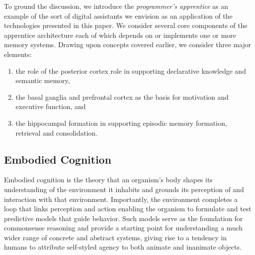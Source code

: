 \documentclass[letterpaper,11pt]{article}
\def\footnote#1{{}}
\def\urlh#1{{}}
\begin{document}
To ground the discussion, we introduce the {\it{programmer's apprentice}} as an example of the sort of digital assistants we envision as an application of the technologies presented in this paper. We consider several core components of the apprentice architecture each of which depends on or implements one or more memory systems. Drawing upon concepts covered earlier, we consider three major elements:
%
\begin{enumerate}
%
\item the role of the posterior cortex role in supporting declarative knowledge and semantic memory,
%
\item the basal ganglia and prefrontal cortex as the basis for motivation and executive function, and
%
\item the hippocampal formation\footnote{%
%
  The {\urlh{https://en.wikipedia.org/wiki/Hippocampal_formation}{hippocampal formation}} is a compound structure located in the medial temporal cortex that consists of the dentate gyrus, the {\urlh{https://en.wikipedia.org/wiki/Hippocampus}{hippocampus}} proper, subiculum and, depending on whom you consult, presubiculum, parasubiculum and {\urlh{https://en.wikipedia.org/wiki/Entorhinal_cortex}{entorhinal cortex}}.} 
%
in supporting episodic memory formation, retrieval and consolidation.
%
\end{enumerate}


\subsection{Embodied Cognition}
\label{subsection_embodied_cognition}




Embodied cognition is the theory that an organism's body shapes its understanding of the environment it inhabits and grounds its perception of and interaction with that environment. Importantly, the environment completes a loop that links perception and action enabling the organism to formulate and test predictive models that guide behavior. Such models serve as the foundation for commonsense reasoning and provide a starting point for understanding a much wider range of concrete and abstract systems, giving rise to a tendency in humans to attribute self-styled agency to both animate and inanimate objects.
\end{document}
